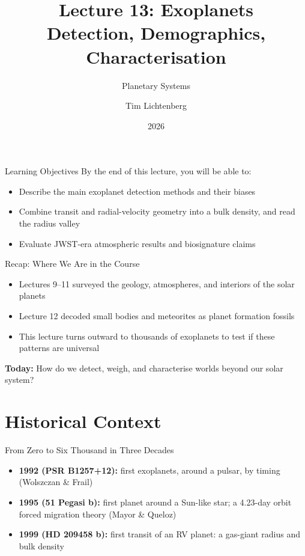 \documentclass[aspectratio=169, 11pt]{beamer}
\title[Lecture 13: Exoplanets]{Lecture 13: Exoplanets\\Detection, Demographics, Characterisation}
\subtitle{Planetary Systems}
\author[L13]{Tim Lichtenberg}
\institute{Kapteyn Astronomical Institute\\University of Groningen}
\date{2026}
\begin{document}
\begin{frame}
  \titlepage
\end{frame}

\begin{frame}{Learning Objectives}
  By the end of this lecture, you will be able to:
  \vskip8pt
  \begin{itemize}
    \item Describe the main exoplanet detection methods and their biases
    \item Combine transit and radial-velocity geometry into a bulk density, and read the radius valley
    \item Evaluate JWST-era atmospheric results and biosignature claims
  \end{itemize}
  \vskip8pt
\end{frame}

\begin{frame}{Recap: Where We Are in the Course}
  \begin{itemize}
    \item Lectures 9--11 surveyed the geology, atmospheres, and interiors of the solar planets
    \item Lecture 12 decoded small bodies and meteorites as planet formation fossils
    \item This lecture turns outward to thousands of exoplanets to test if these patterns are universal
  \end{itemize}
  \vskip8pt
  \textbf{Today:} How do we detect, weigh, and characterise worlds beyond our solar system?
\end{frame}


\section{Historical Context}

\begin{frame}{From Zero to Six Thousand in Three Decades}
  \begin{itemize}\setlength\itemsep{4pt}
    \item \textbf{1992 (PSR B1257+12):} first exoplanets, around a pulsar, by timing (Wolszczan \& Frail)
    \item \textbf{1995 (51 Pegasi b):} first planet around a Sun-like star; a 4.23-day orbit forced migration theory (Mayor \& Queloz)
    \item \textbf{1999 (HD 209458 b):} first transit of an RV planet: a gas-giant radius and bulk density
  \end{itemize}
\end{frame}
\end{document}

